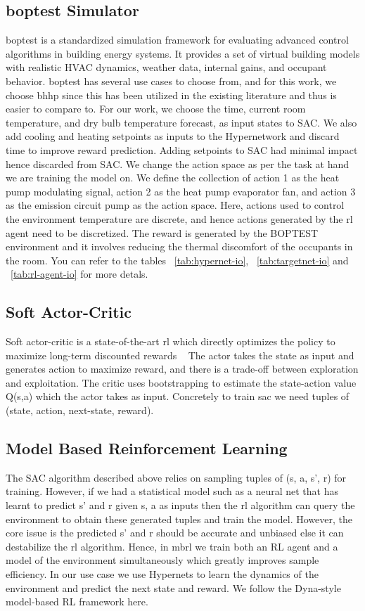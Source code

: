 \documentclass{article}
\begin{document}
\subsection{\gls{boptest} Simulator}
\gls{boptest} \cite{Blum} is a standardized simulation framework for evaluating advanced control algorithms in building energy systems. It provides a set of virtual building models with realistic HVAC dynamics, weather data, internal gains, and occupant behavior.
\gls{boptest} has several use cases to choose from, and for this work, we choose \gls{bhhp} since this has been utilized in the existing literature and thus is easier to compare to.
For our work, we choose the time, current room temperature, and dry bulb temperature forecast, as input states to SAC.
We also add cooling and heating setpoints as inputs to the Hypernetwork and discard time to improve reward prediction. Adding setpoints to SAC had minimal impact hence discarded from SAC.
We change the action space as per the task at hand we are training the model on.
We define the collection of action 1 as the heat pump modulating signal, action 2 as the heat pump evaporator fan, and action 3 as the emission circuit pump as the action space.
Here, actions used to control the environment temperature are discrete, and hence actions generated by the \gls{rl} agent need to be discretized. 
The reward is generated by the BOPTEST environment and it involves reducing the thermal discomfort of the occupants in the room.
You can refer to the tables ~\ref{tab:hypernet-io}, ~\ref{tab:targetnet-io} and ~\ref{tab:rl-agent-io} for more detals.

\subsection{Soft Actor-Critic}
Soft actor-critic is a state-of-the-art \gls{rl} which directly optimizes the policy to maximize long-term discounted rewards ~\cite{Haarnoja}
The actor takes the state as input and generates action to maximize reward, and there is a trade-off between exploration and exploitation. The critic uses bootstrapping to estimate the state-action value Q(s,a) which the actor takes as input.
Concretely to train \gls{sac} we need tuples of (state, action, next-state, reward).


\subsection{Model Based Reinforcement Learning}
The SAC algorithm described above relies on sampling tuples of (s, a, s', r) for training. However, if we had a statistical model such as a neural net that has learnt to predict s' and r given s, a as inputs then the \gls{rl} algorithm can query the environment to obtain these generated tuples and train the model. However, the core issue is the predicted s' and r should be accurate and unbiased else it can destabilize the \gls{rl} algorithm.
Hence, in \gls{mbrl} we train both an RL agent and a model of the environment simultaneously which greatly improves sample efficiency.
In our use case we use Hypernets \cite{Chauhan} to learn the dynamics of the environment and predict the next state and reward. We follow the Dyna-style model-based RL framework here.
\end{document}
